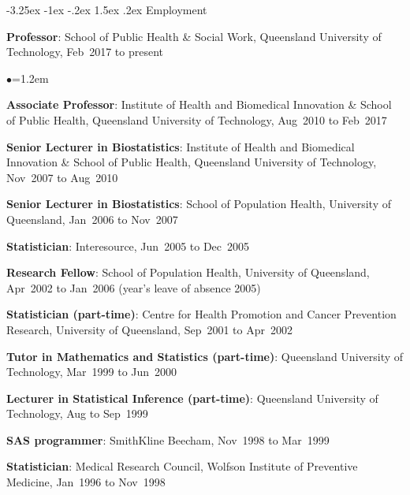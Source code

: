 \documentclass[a4paper,11pt]{article}
\makeatletter
\renewcommand\subsection{\@startsection{subsection}{2}{\z@}%
                                       {-3.25ex \@plus -1ex \@minus -.2ex}%
                                       {1.5ex \@plus .2ex}%
                                   {\normalfont\normalsize\bfseries\color{blue}}}
\renewcommand{\labelitemi}{$\bullet$}
\makeatother
\begin{document}
\begin{raggedright}
\subsection{Employment}

\textbf{Professor}: School of Public Health \& Social Work, Queensland University of Technology, Feb~2017 to present

\begin{list}{\labelitemi}{\leftmargin=1.2em}\addtolength{\itemsep}{-0.5\baselineskip}
\item \textbf{Associate Professor}: Institute of Health and Biomedical Innovation \& School of Public Health, Queensland University of Technology, Aug~2010 to Feb~2017

\item \textbf{Senior Lecturer in Biostatistics}: Institute of Health and Biomedical Innovation \& School of Public Health, Queensland University of Technology, Nov~2007 to Aug~2010

\item \textbf{Senior Lecturer in Biostatistics}: School of Population Health, University of Queensland, Jan~2006 to Nov~2007

\item \textbf{Statistician}: Interesource, Jun~2005 to Dec~2005

\item \textbf{Research Fellow}: School of Population Health, University of Queensland, Apr~2002 to Jan~2006 (year's leave of absence 2005)

\item \textbf{Statistician (part-time)}: Centre for Health Promotion and Cancer Prevention Research, University of Queensland, Sep~2001 to Apr~2002

\item \textbf{Tutor in Mathematics and Statistics (part-time)}: Queensland University of Technology, Mar~1999 to Jun~2000

\item \textbf{Lecturer in Statistical Inference (part-time)}: Queensland University of Technology, Aug to Sep~1999


\item \textbf{SAS programmer}: SmithKline Beecham, Nov~1998 to Mar~1999

\item \textbf{Statistician}: Medical Research Council, Wolfson Institute of Preventive Medicine, Jan~1996 to Nov~1998


\end{list}
\end{raggedright}
\end{document}
